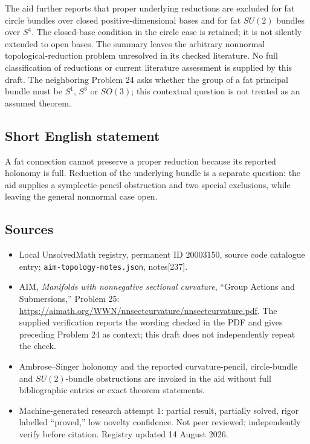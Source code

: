 \documentclass[11pt]{article}
\begin{document}
The aid further reports that proper underlying reductions are excluded for fat circle bundles over closed positive-dimensional bases and for fat $SU(2)$ bundles over $S^4$. The closed-base condition in the circle case is retained; it is not silently extended to open bases. The summary leaves the arbitrary nonnormal topological-reduction problem unresolved in its checked literature. No full classification of reductions or current literature assessment is supplied by this draft. The neighboring Problem 24 asks whether the group of a fat principal bundle must be $S^1$, $S^3$ or $SO(3)$; this contextual question is not treated as an assumed theorem.
\subsection{Short English statement}
A fat connection cannot preserve a proper reduction because its reported holonomy is full. Reduction of the underlying bundle is a separate question: the aid supplies a symplectic-pencil obstruction and two special exclusions, while leaving the general nonnormal case open.
\subsection{Sources}
\begin{itemize}
\item Local UnsolvedMath registry, permanent ID 20003150, source code catalogue entry; \texttt{aim-topology-notes.json}, notes[237].
\item AIM, \emph{Manifolds with nonnegative sectional curvature}, ``Group Actions and Submersions,'' Problem 25: \url{https://aimath.org/WWN/nnsectcurvature/nnsectcurvature.pdf}. The supplied verification reports the wording checked in the PDF and gives preceding Problem 24 as context; this draft does not independently repeat the check.
\item Ambrose--Singer holonomy and the reported curvature-pencil, circle-bundle and $SU(2)$-bundle obstructions are invoked in the aid without full bibliographic entries or exact theorem statements.
\item Machine-generated research attempt 1: partial result, partially solved, rigor labelled ``proved,'' low novelty confidence. Not peer reviewed; independently verify before citation. Registry updated 14 August 2026.
\end{itemize}
\end{document}
